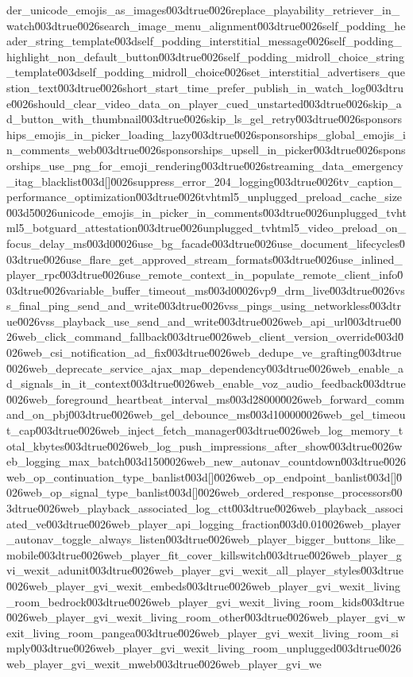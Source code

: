 {der_unicode_emojis_as_images\u003dtrue\u0026replace_playability_retriever_in_watch\u003dtrue\u0026search_image_menu_alignment\u003dtrue\u0026self_podding_header_string_template\u003dself_podding_interstitial_message\u0026self_podding_highlight_non_default_button\u003dtrue\u0026self_podding_midroll_choice_string_template\u003dself_podding_midroll_choice\u0026set_interstitial_advertisers_question_text\u003dtrue\u0026short_start_time_prefer_publish_in_watch_log\u003dtrue\u0026should_clear_video_data_on_player_cued_unstarted\u003dtrue\u0026skip_ad_button_with_thumbnail\u003dtrue\u0026skip_ls_gel_retry\u003dtrue\u0026sponsorships_emojis_in_picker_loading_lazy\u003dtrue\u0026sponsorships_global_emojis_in_comments_web\u003dtrue\u0026sponsorships_upsell_in_picker\u003dtrue\u0026sponsorships_use_png_for_emoji_rendering\u003dtrue\u0026streaming_data_emergency_itag_blacklist\u003d[]\u0026suppress_error_204_logging\u003dtrue\u0026tv_caption_performance_optimization\u003dtrue\u0026tvhtml5_unplugged_preload_cache_size\u003d5\u0026unicode_emojis_in_picker_in_comments\u003dtrue\u0026unplugged_tvhtml5_botguard_attestation\u003dtrue\u0026unplugged_tvhtml5_video_preload_on_focus_delay_ms\u003d0\u0026use_bg_facade\u003dtrue\u0026use_document_lifecycles\u003dtrue\u0026use_flare_get_approved_stream_formats\u003dtrue\u0026use_inlined_player_rpc\u003dtrue\u0026use_remote_context_in_populate_remote_client_info\u003dtrue\u0026variable_buffer_timeout_ms\u003d0\u0026vp9_drm_live\u003dtrue\u0026vss_final_ping_send_and_write\u003dtrue\u0026vss_pings_using_networkless\u003dtrue\u0026vss_playback_use_send_and_write\u003dtrue\u0026web_api_url\u003dtrue\u0026web_click_command_fallback\u003dtrue\u0026web_client_version_override\u003d\u0026web_csi_notification_ad_fix\u003dtrue\u0026web_dedupe_ve_grafting\u003dtrue\u0026web_deprecate_service_ajax_map_dependency\u003dtrue\u0026web_enable_ad_signals_in_it_context\u003dtrue\u0026web_enable_voz_audio_feedback\u003dtrue\u0026web_foreground_heartbeat_interval_ms\u003d28000\u0026web_forward_command_on_pbj\u003dtrue\u0026web_gel_debounce_ms\u003d10000\u0026web_gel_timeout_cap\u003dtrue\u0026web_inject_fetch_manager\u003dtrue\u0026web_log_memory_total_kbytes\u003dtrue\u0026web_log_push_impressions_after_show\u003dtrue\u0026web_logging_max_batch\u003d150\u0026web_new_autonav_countdown\u003dtrue\u0026web_op_continuation_type_banlist\u003d[]\u0026web_op_endpoint_banlist\u003d[]\u0026web_op_signal_type_banlist\u003d[]\u0026web_ordered_response_processors\u003dtrue\u0026web_playback_associated_log_ctt\u003dtrue\u0026web_playback_associated_ve\u003dtrue\u0026web_player_api_logging_fraction\u003d0.01\u0026web_player_autonav_toggle_always_listen\u003dtrue\u0026web_player_bigger_buttons_like_mobile\u003dtrue\u0026web_player_fit_cover_killswitch\u003dtrue\u0026web_player_gvi_wexit_adunit\u003dtrue\u0026web_player_gvi_wexit_all_player_styles\u003dtrue\u0026web_player_gvi_wexit_embeds\u003dtrue\u0026web_player_gvi_wexit_living_room_bedrock\u003dtrue\u0026web_player_gvi_wexit_living_room_kids\u003dtrue\u0026web_player_gvi_wexit_living_room_other\u003dtrue\u0026web_player_gvi_wexit_living_room_pangea\u003dtrue\u0026web_player_gvi_wexit_living_room_simply\u003dtrue\u0026web_player_gvi_wexit_living_room_unplugged\u003dtrue\u0026web_player_gvi_wexit_mweb\u003dtrue\u0026web_player_gvi_we}
